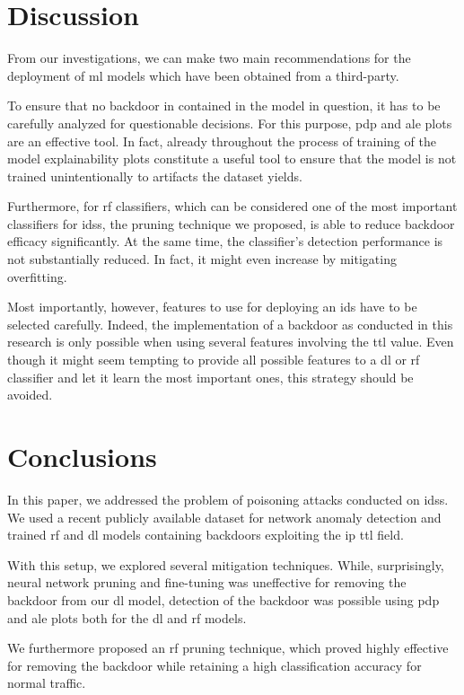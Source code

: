 \documentclass[10pt,sigconf,letterpaper,dvipsnames]{acmart}
\begin{document}
\section{Discussion}
From our investigations, we can make two main recommendations for the deployment of \gls{ml} models which have been obtained from a third-party.

To ensure that no backdoor in contained in the model in question, it has to be carefully analyzed for questionable decisions. For this purpose, \gls{pdp} and \gls{ale} plots are an effective tool. In fact, already throughout the process of training of the model explainability plots constitute a useful tool to ensure that the model is not trained unintentionally to artifacts the dataset yields.

Furthermore, for \gls{rf} classifiers, which can be considered one of the most important classifiers for \glspl{ids}, the pruning technique we proposed, is able to reduce backdoor efficacy significantly. At the same time, the classifier's detection performance is not substantially reduced. In fact, it might even increase by mitigating overfitting.

Most importantly, however, features to use for deploying an \gls{ids} have to be selected carefully. Indeed, the implementation of a backdoor as conducted in this research is only possible when using several features involving the \gls{ttl} value. Even though it might seem tempting to provide all possible features to a \gls{dl} or \gls{rf} classifier and let it learn the most important ones, this strategy should be avoided.

\section{Conclusions}
In this paper, we addressed the problem of poisoning attacks conducted on \glspl{ids}. We used a recent publicly available dataset for network anomaly detection and trained \gls{rf} and \gls{dl} models containing backdoors exploiting the \gls{ip} \gls{ttl} field.

With this setup, we explored several mitigation techniques. While, surprisingly, neural network pruning and fine-tuning was uneffective for removing the backdoor from our \gls{dl} model, detection of the backdoor was possible using \gls{pdp} and \gls{ale} plots both for the \gls{dl} and \gls{rf} models.

We furthermore proposed an \gls{rf} pruning technique, which proved highly effective for removing the backdoor while retaining a high classification accuracy for normal traffic.
\end{document}
